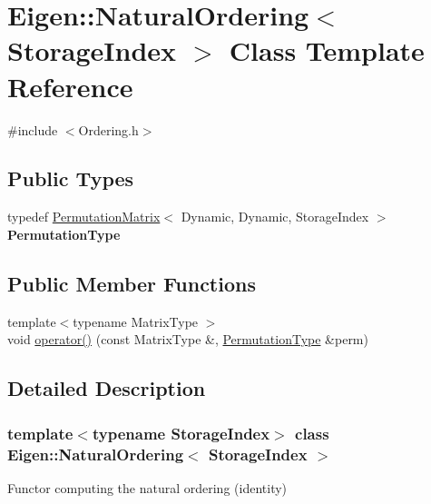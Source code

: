 \hypertarget{class_eigen_1_1_natural_ordering}{}\section{Eigen\+::Natural\+Ordering$<$ Storage\+Index $>$ Class Template Reference}
\label{class_eigen_1_1_natural_ordering}


{\ttfamily \#include $<$Ordering.\+h$>$}

\subsection*{Public Types}
\begin{DoxyCompactItemize}
\item 
\mbox{\label{class_eigen_1_1_natural_ordering_af196b0c294dd9f01c99349bbaee1cd11}} 
typedef \mbox{\hyperlink{class_eigen_1_1_permutation_matrix}{Permutation\+Matrix}}$<$ Dynamic, Dynamic, Storage\+Index $>$ {\bfseries Permutation\+Type}
\end{DoxyCompactItemize}
\subsection*{Public Member Functions}
\begin{DoxyCompactItemize}
\item 
{\footnotesize template$<$typename Matrix\+Type $>$ }\\void \mbox{\hyperlink{class_eigen_1_1_natural_ordering_aa39e772105ed66da9e909f2a9385be37}{operator()}} (const Matrix\+Type \&, \mbox{\hyperlink{class_eigen_1_1_permutation_matrix}{Permutation\+Type}} \&perm)
\end{DoxyCompactItemize}


\subsection{Detailed Description}
\subsubsection*{template$<$typename Storage\+Index$>$\newline
class Eigen\+::\+Natural\+Ordering$<$ Storage\+Index $>$}

Functor computing the natural ordering (identity)


